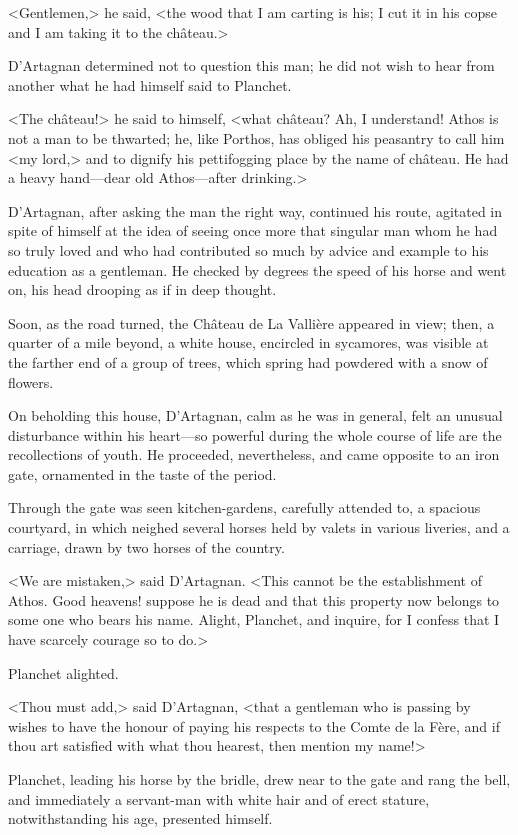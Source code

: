 <Gentlemen,> he said, <the wood that I am carting is his; I cut it in his copse and I am taking it to the château.>

D'Artagnan determined not to question this man; he did not wish to hear from another what he had himself said to Planchet.

<The château!> he said to himself, <what château? Ah, I understand! Athos is not a man to be thwarted; he, like Porthos, has obliged his peasantry to call him <my lord,> and to dignify his pettifogging place by the name of château. He had a heavy hand—dear old Athos—after drinking.>

D'Artagnan, after asking the man the right way, continued his route, agitated in spite of himself at the idea of seeing once more that singular man whom he had so truly loved and who had contributed so much by advice and example to his education as a gentleman. He checked by degrees the speed of his horse and went on, his head drooping as if in deep thought.

Soon, as the road turned, the Château de La Vallière appeared in view; then, a quarter of a mile beyond, a white house, encircled in sycamores, was visible at the farther end of a group of trees, which spring had powdered with a snow of flowers.

On beholding this house, D'Artagnan, calm as he was in general, felt an unusual disturbance within his heart—so powerful during the whole course of life are the recollections of youth. He proceeded, nevertheless, and came opposite to an iron gate, ornamented in the taste of the period.

Through the gate was seen kitchen-gardens, carefully attended to, a spacious courtyard, in which neighed several horses held by valets in various liveries, and a carriage, drawn by two horses of the country.

<We are mistaken,> said D'Artagnan. <This cannot be the establishment of Athos. Good heavens! suppose he is dead and that this property now belongs to some one who bears his name. Alight, Planchet, and inquire, for I confess that I have scarcely courage so to do.>

Planchet alighted.

<Thou must add,> said D'Artagnan, <that a gentleman who is passing by wishes to have the honour of paying his respects to the Comte de la Fère, and if thou art satisfied with what thou hearest, then mention my name!>

Planchet, leading his horse by the bridle, drew near to the gate and rang the bell, and immediately a servant-man with white hair and of erect stature, notwithstanding his age, presented himself.

